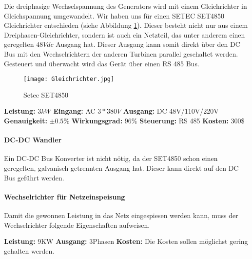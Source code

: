 Die dreiphasige Wechselspannung des Generators wird mit einem Gleichrichter in Gleichspannung umgewandelt. Wir haben uns für einen SETEC SET4850 Gleichrichter entschieden (siehe Abbildung \ref{fig:Gleichrichter}). Dieser besteht nicht nur aus einem Dreiphasen-Gleichrichter, sondern ist auch ein Netzteil, das unter anderem einen geregelten \(48Vdc\) Ausgang hat. Dieser Ausgang kann somit direkt über den DC Bus mit den Wechselrichtern der anderen Turbinen parallel geschaltet werden. Gesteuert und überwacht wird das Gerät über einen RS 485 Bus.

\begin{figure}[H]
\centering
\texttt{[image: Gleichrichter.jpg]}
\caption{Setec SET4850 \cite{gleichrichter}}
\label{fig:Gleichrichter}
\end{figure}

\textbf{Leistung:}		\(3 kW\) 			\newline
\textbf{Eingang:}		AC \(3 * 380V\) 	\newline
\textbf{Ausgang:}		DC 48V/110V/220V 	\newline
\textbf{Genauigkeit:}	\(\pm 0.5 \%\)		\newline
\textbf{Wirkungsgrad:}	\(96\%\) 			\newline
\textbf{Steuerung:}		RS 485 				\newline
\textbf{Kosten:}		300\$				\newline


\paragraph{DC-DC Wandler}
Ein DC-DC Bus Konverter ist nicht nötig, da der SET4850 schon einen geregelten, galvanisch getrennten Ausgang hat. Dieser kann direkt auf den DC Bus geführt werden.


\paragraph{Wechselrichter für Netzeinspeisung} \label{par:WechselrichterNetz}

Damit die gewonnen Leistung in das Netz eingespiesen werden kann, muss der Wechselrichter folgende Eigenschaften aufweisen. 

\textbf{Leistung:}		9KW \newline
\textbf{Ausgang:}		3Phasen \newline
\textbf{Kosten:}		Die Kosten sollen möglichst gering gehalten werden. \newline

